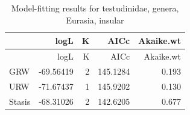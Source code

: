 \begin{longtable}[]{@{}lrrrr@{}}
	\caption{Model-fitting results for testudinidae, genera, Eurasia,
		insular}
	\label{tab:pTSEsIEM}\tabularnewline
	\toprule
	& logL & K & AICc & Akaike.wt\tabularnewline
	\midrule
	\endfirsthead
	\toprule
	& logL & K & AICc & Akaike.wt\tabularnewline
	\midrule
	\endhead
	GRW & -69.56419 & 2 & 145.1284 & 0.193\tabularnewline
	URW & -71.67437 & 1 & 145.9202 & 0.130\tabularnewline
	Stasis & -68.31026 & 2 & 142.6205 & 0.677\tabularnewline
	\bottomrule
\end{longtable}


\FloatBarrier